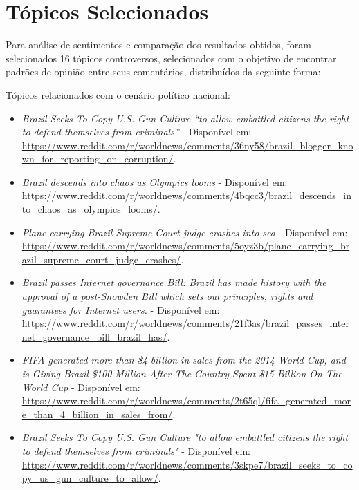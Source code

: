 \section{Tópicos Selecionados}

Para análise de sentimentos e comparação dos resultados obtidos, foram
selecionados 16 tópicos controversos, selecionados com o objetivo de encontrar
padrões de opinião entre seus comentários, distribuídos da seguinte forma:

Tópicos relacionados com o cenário político nacional:

\begin{itemize}
  \item
  \textit{Brazil Seeks To Copy U.S. Gun Culture ``to allow embattled
  citizens the right to defend themselves from
  criminals''} - Disponível em: 
  \url{https://www.reddit.com/r/worldnews/comments/36ny58/brazil_blogger_known_for_reporting_on_corruption/}.
  \item
  \textit{Brazil descends into chaos as Olympics looms} - Disponível em: 
  \url{https://www.reddit.com/r/worldnews/comments/4bqcc3/brazil_descends_into_chaos_as_olympics_looms/}.
  \item
  \textit{Plane carrying Brazil Supreme Court judge crashes into sea}
   - Disponível em: \url{https://www.reddit.com/r/worldnews/comments/5oyz3b/plane_carrying_brazil_supreme_court_judge_crashes/}.
  \item
  \textit{Brazil passes Internet governance Bill: Brazil has made history with
  the approval of a post-Snowden Bill which sets out principles, rights and guarantees for Internet users.} - Disponível em: \url{https://www.reddit.com/r/worldnews/comments/21f3as/brazil_passes_internet_governance_bill_brazil_has/}.
  \item
  \textit{FIFA generated more than \$4 billion in sales from the 2014 World Cup,
  and is Giving Brazil \$100 Million After The Country Spent \$15 Billion On The
  World Cup} - Disponível em: \url{https://www.reddit.com/r/worldnews/comments/2t65ql/fifa_generated_more_than_4_billion_in_sales_from/}.
  \item
  \textit{Brazil Seeks To Copy U.S. Gun Culture "to allow embattled citizens the
  right to defend themselves from
  criminals"} - Disponível em: \url{https://www.reddit.com/r/worldnews/comments/3skpe7/brazil_seeks_to_copy_us_gun_culture_to_allow/}.
\end{itemize}

